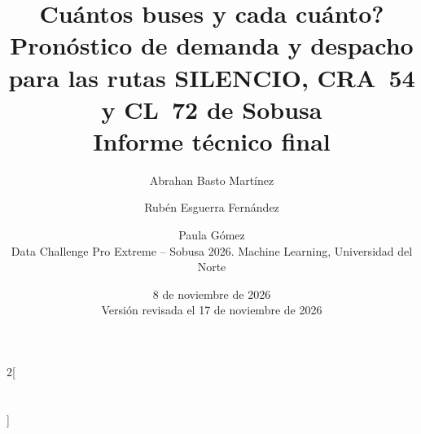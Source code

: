 \documentclass[11pt,a4paper]{article}
\title{\textbf{\textquestiondown Cuántos buses y cada cuánto? Pronóstico de demanda y despacho para las rutas SILENCIO, CRA~54 y CL~72 de Sobusa}\\[4pt]
\large Informe técnico final}
\author{Abrahan Basto Martínez \and Rubén Esguerra Fernández \and Paula Gómez\\[4pt]
\small Data Challenge Pro Extreme -- Sobusa 2026. Machine Learning, Universidad del Norte}
\date{8 de noviembre de 2026\\[2pt] \small Versión revisada el 17 de noviembre de 2026}
\begin{document}
\maketitle











\begingroup
\renewcommand{\bibsection}{}
\setlength{\premulticols}{20pt}
\raggedcolumns
\begin{multicols}{2}[\section*{\refname}]


\end{multicols}
\endgroup

\appendix

\end{document}

